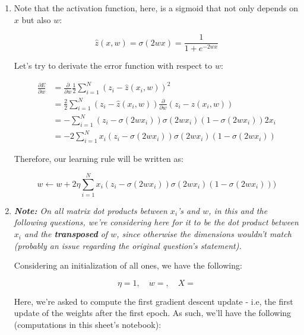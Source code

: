 \documentclass[12pt]{article}
\begin{document}
\begin{enumerate}[leftmargin=\labelsep]
  \begin{enumerate}
    \item {
          Note that the activation function, here, is a sigmoid that not only depends
          on $x$ but also $w$:

          $$
            \hat{z}(x, w) = \sigma(2wx) =  \frac{1}{1 + e^{-2 w x}}
          $$

          Let's try to derivate the error function with respect to $w$:

          \begin{align*}
            \frac{\partial E}{\partial w} & = \frac{\partial}{\partial w} \frac{1}{2} \sum_{i=1}^N (z_i - \hat{z}(x_i, w))^2                       \\
                                          & = \frac{2}{2} \sum_{i=1}^N (z_i - \hat{z}(x_i, w)) \frac{\partial}{\partial w} (z_i - \hat{z}(x_i, w)) \\
                                          & = - \sum_{i=1}^N (z_i - \sigma(2wx_i)) \sigma(2wx_i) (1 - \sigma(2wx_i)) 2x_i                          \\
                                          & = -2 \sum_{i=1}^N x_i (z_i - \sigma(2wx_i)) \sigma(2wx_i) (1 - \sigma(2wx_i))
          \end{align*}

          Therefore, our learning rule will be written as:

          $$
            w \leftarrow w + 2\eta \sum_{i=1}^N x_i (z_i - \sigma(2wx_i)) \sigma(2wx_i) (1 - \sigma(2wx_i)))
          $$
          }
    \item {

          \textit{\textbf{Note:} On all matrix dot products between $x_i$'s and $w$, in this and
            the following questions, we're considering here for it to be the dot product between
            $x_i$ and the \textbf{transposed} of $w$, since otherwise the dimensions wouldn't match
            (probably an issue regarding the original question's statement).}

          Considering an initialization of all ones, we have the following:

          $$
            \eta = 1, \quad w = , \quad X = 
          $$

          Here, we're asked to compute the first gradient descent update - i.e,
          the first update of the weights after the first epoch. As such, we'll have
          the following (computations in this sheet's notebook):

}
\end{enumerate}
\end{enumerate}
\end{document}
